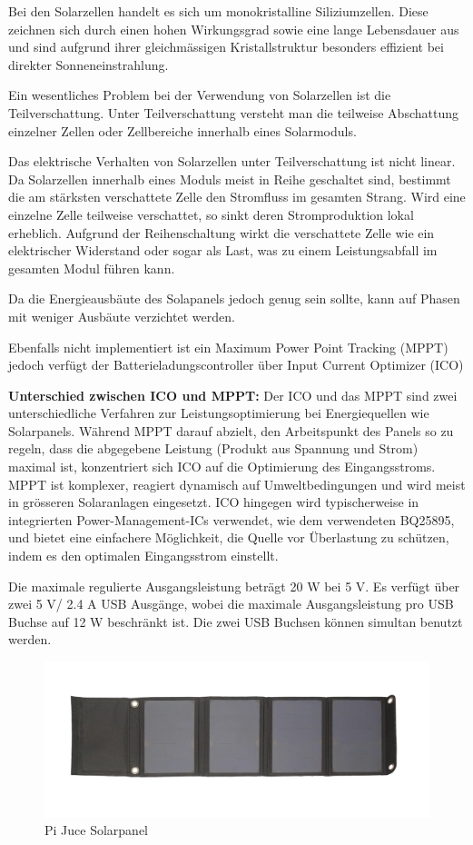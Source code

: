 Bei den Solarzellen handelt es sich um monokristalline Siliziumzellen. Diese zeichnen sich durch einen hohen Wirkungsgrad sowie eine lange Lebensdauer aus und sind aufgrund ihrer gleichmässigen Kristallstruktur besonders effizient bei direkter Sonneneinstrahlung.

Ein wesentliches Problem bei der Verwendung von Solarzellen ist die Teilverschattung. Unter Teilverschattung versteht man die teilweise Abschattung einzelner Zellen oder Zellbereiche innerhalb eines Solarmoduls.

Das elektrische Verhalten von Solarzellen unter Teilverschattung ist nicht linear. Da Solarzellen innerhalb eines Moduls meist in Reihe geschaltet sind, bestimmt die am stärksten verschattete Zelle den Stromfluss im gesamten Strang. Wird eine einzelne Zelle teilweise verschattet, so sinkt deren Stromproduktion lokal erheblich. Aufgrund der Reihenschaltung wirkt die verschattete Zelle wie ein elektrischer Widerstand oder sogar als Last, was zu einem Leistungsabfall im gesamten Modul führen kann.

Da die Energieausbäute  des Solapanels jedoch genug sein sollte, kann auf Phasen mit weniger Ausbäute verzichtet werden.

Ebenfalls nicht implementiert ist ein Maximum Power Point Tracking (MPPT) jedoch verfügt der Batterieladungscontroller über Input Current Optimizer (ICO)

\textbf{Unterschied zwischen ICO und MPPT:}
Der ICO und das MPPT sind zwei unterschiedliche Verfahren zur Leistungsoptimierung bei Energiequellen wie Solarpanels. Während MPPT darauf abzielt, den Arbeitspunkt des Panels so zu regeln, dass die abgegebene Leistung (Produkt aus Spannung und Strom) maximal ist, konzentriert sich ICO auf die Optimierung des Eingangsstroms. MPPT ist komplexer, reagiert dynamisch auf Umweltbedingungen und wird meist in grösseren Solaranlagen eingesetzt. ICO hingegen wird typischerweise in integrierten Power-Management-ICs verwendet, wie dem verwendeten BQ25895, und bietet eine einfachere Möglichkeit, die Quelle vor Überlastung zu schützen, indem es den optimalen Eingangsstrom einstellt.


Die maximale regulierte Ausgangsleistung beträgt 20 W bei 5 V. Es verfügt über zwei 5 V/ 2.4 A USB Ausgänge, wobei die maximale Ausgangsleistung pro USB Buchse auf 12 W beschränkt ist. Die zwei USB Buchsen können simultan benutzt werden.
\begin{figure}[H]
\centering
    \includegraphics[width=1\linewidth]{assets/Pi juce.png}
    \caption{Pi Juce Solarpanel}
    \label{fig:enter-label}
\end{figure}


